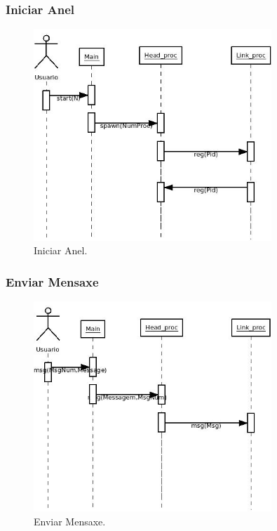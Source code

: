 \documentclass[DIV=calc,paper=a4,fontsize=11pt,onecolumn]{scrartcl}	 %
\begin{document}
\subsubsection{Iniciar Anel}

\begin{figure}[h!]
\centering
\includegraphics[width=0.8\textwidth]{./figuras/Diagrama3.jpeg}
\caption{Iniciar Anel.}
\label{fig:anelEstCU}
\end{figure}

\newpage
\subsubsection{Enviar Mensaxe}

\begin{figure}[h!]
\centering
\includegraphics[width=0.8\textwidth]{./figuras/Diagrama4.jpeg}
\caption{Enviar Mensaxe.}
\label{fig:anelEstCU}
\end{figure}
\end{document}
